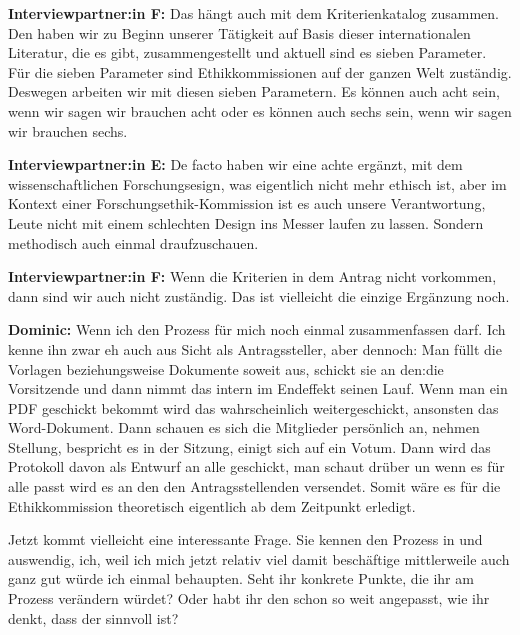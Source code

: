 \documentclass[a4paper,12pt,twoside]{scrreprt}
\begin{document}
\textbf{Interviewpartner:in F:} Das hängt auch mit dem Kriterienkatalog zusammen. Den haben wir zu Beginn unserer Tätigkeit auf Basis dieser internationalen Literatur, die es gibt, zusammengestellt und aktuell sind es sieben Parameter. Für die sieben Parameter sind Ethikkommissionen auf der ganzen Welt zuständig. Deswegen arbeiten wir mit diesen sieben Parametern. Es können auch acht sein, wenn wir sagen wir brauchen acht oder es können auch sechs sein, wenn wir sagen wir brauchen sechs.

\textbf{Interviewpartner:in E:} De facto haben wir eine achte ergänzt, mit dem wissenschaftlichen Forschungsesign, was eigentlich nicht mehr ethisch ist, aber im Kontext einer Forschungsethik-Kommission ist es auch unsere Verantwortung, Leute nicht mit einem schlechten Design ins Messer laufen zu lassen. Sondern methodisch auch einmal draufzuschauen.

\textbf{Interviewpartner:in F:} Wenn die Kriterien in dem Antrag nicht vorkommen, dann sind wir auch nicht zuständig. Das ist vielleicht die einzige Ergänzung noch.

\textbf{Dominic:} Wenn ich den Prozess für mich noch einmal zusammenfassen darf. Ich kenne ihn zwar eh auch aus Sicht als Antragssteller, aber dennoch: Man füllt die Vorlagen beziehungsweise Dokumente soweit aus, schickt sie an den:die Vorsitzende und dann nimmt das intern im Endeffekt seinen Lauf. Wenn man ein PDF geschickt bekommt wird das wahrscheinlich weitergeschickt, ansonsten das Word-Dokument. Dann schauen es sich die Mitglieder persönlich an, nehmen Stellung, bespricht es in der Sitzung, einigt sich auf ein Votum. Dann wird das Protokoll davon als Entwurf an alle geschickt, man schaut drüber un wenn es für alle passt wird es an den den Antragsstellenden versendet. Somit wäre es für die Ethikkommission theoretisch eigentlich ab dem Zeitpunkt erledigt.

Jetzt kommt vielleicht eine interessante Frage. Sie kennen den Prozess in und auswendig, ich, weil ich mich jetzt relativ viel damit beschäftige mittlerweile auch ganz gut würde ich einmal behaupten. Seht ihr konkrete Punkte, die ihr am Prozess verändern würdet? Oder habt ihr den schon so weit angepasst, wie ihr denkt, dass der sinnvoll ist?
\end{document}
